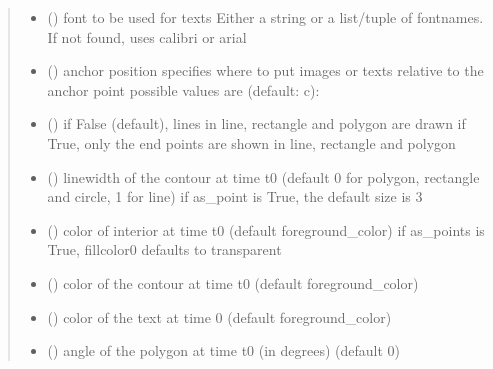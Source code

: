 \documentclass[letterpaper,10pt,english]{sphinxmanual}
\begin{document}
\begin{fulllineitems}
\begin{quote}
\begin{description}
\begin{itemize}
\item {} 
 () \textendash{} font to be used for texts 
Either a string or a list/tuple of fontnames.
If not found, uses calibri or arial

\item {} 
 () \textendash{} anchor position 
specifies where to put images or texts relative to the anchor
point 
possible values are (default: c): 

\item {} 
 () \textendash{} if False (default), lines in line, rectangle and polygon are drawn 
if True, only the end points are shown in line, rectangle and polygon

\item {} 
 () \textendash{} linewidth of the contour at time t0 (default 0 for polygon, rectangle and circle, 1 for line) 
if as\_point is True, the default size is 3

\item {} 
 () \textendash{} color of interior at time t0 (default foreground\_color) 
if as\_points is True, fillcolor0 defaults to transparent

\item {} 
 () \textendash{} color of the contour at time t0 (default foreground\_color)

\item {} 
 () \textendash{} color of the text at time 0 (default foreground\_color)

\item {} 
 () \textendash{} angle of the polygon at time t0 (in degrees) (default 0)


\end{itemize}
\end{description}
\end{quote}
\end{fulllineitems}
\end{document}
